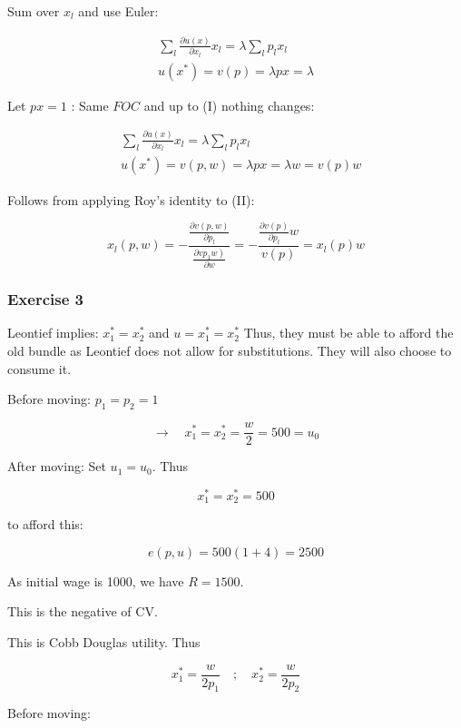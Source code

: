 {{\begin{enumerate}[label=(\alph*)]
{Sum over $x_{l}$ and use Euler:

\begin{align*}
    \sum_{l} \frac{\partial u(x)}{\partial x_{l}} x_{l}=\lambda \sum_{l} p_l x_{l}  \tag{I} \\
    u\left(x^{*}\right)=v(p)=\lambda p x=\lambda
\end{align*}


Let $p x=1$ : Same $F O C$ and up to (I) nothing changes:

\begin{align*}
    & \sum_{l} \frac{\partial u(x)}{\partial x_{l}} x_{l}=\lambda \sum_l p_l x_{l} \\
    & u\left(x^{*}\right)=v(p, w)=\lambda p x=\lambda w=v(p) w \tag{II}
\end{align*}
}
{\item 
Follows from applying Roy's identity to (II):

$$
x_{l}(p, w)=-\frac{\frac{\partial v(p, w)}{\partial p_{l}}}{\frac{\left.\partial v p_{1} w\right)}{\partial w}}=-\frac{\frac{\partial v(p)}{\partial p_{l}} w}{v(p)}=x_{l}(p) w
$$
}
\end{enumerate}
}
{
\subsubsection*{Exercise 3}

\begin{enumerate}[label=(\alph*)]
{\item 
Leontief implies: $x_{1}^{*}=x_{2}^{*}$ and $u=x_{1}^{*}=x_{2}^{*}$ Thus, they must be able to afford the old bundle as Leontief does not allow for substitutions. They will also choose to consume it.

Before moving: $p_{1}=p_{2}=1$

$$
\rightarrow \quad x_{1}^{*}=x_{2}^{*}=\frac{w}{2}=500=u_{0}
$$

After moving: Set $u_{1}=u_{0}$. Thus

$$
x_{1}^{*}=x_{2}^{*}=500
$$

to afford this:

$$
e(p, u)=500(1+4)=2500
$$

As initial wage is 1000, we have $R=1500$.

This is the negative of CV.
}
{\item 
This is Cobb Douglas utility. Thus

$$
x_{1}^{*}=\frac{w}{2 p_{1}} \quad ; \quad x_{2}^{*}=\frac{w}{2 p_{2}}
$$

Before moving:

}
\end{enumerate}}}

